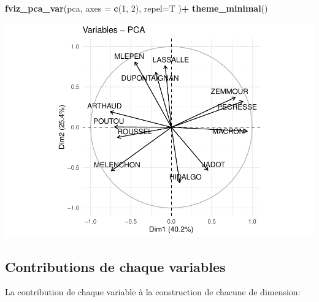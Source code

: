 \documentclass[
]{book}
\newenvironment{Shaded}{\begin{snugshade}}{\end{snugshade}}
\newcommand{\AttributeTok}[1]{\textcolor[rgb]{0.13,0.29,0.53}{#1}}
\newcommand{\DecValTok}[1]{\textcolor[rgb]{0.00,0.00,0.81}{#1}}
\newcommand{\FunctionTok}[1]{\textcolor[rgb]{0.13,0.29,0.53}{\textbf{#1}}}
\newcommand{\NormalTok}[1]{#1}
\newcommand{\SpecialCharTok}[1]{\textcolor[rgb]{0.81,0.36,0.00}{\textbf{#1}}}
\begin{document}
\begin{Shaded}
\begin{Highlighting}[]
\FunctionTok{fviz\_pca\_var}\NormalTok{(pca,  }\AttributeTok{axes =} \FunctionTok{c}\NormalTok{(}\DecValTok{1}\NormalTok{, }\DecValTok{2}\NormalTok{), }\AttributeTok{repel=}\NormalTok{T )}\SpecialCharTok{+}  \FunctionTok{theme\_minimal}\NormalTok{()}
\end{Highlighting}
\end{Shaded}

\includegraphics{manuel_geo_quanti_files/figure-latex/unnamed-chunk-67-1.pdf}

\hypertarget{contributions-de-chaque-variables}{%
\subsection{Contributions de chaque variables}\label{contributions-de-chaque-variables}}

La contribution de chaque variable à la construction de chacune de dimension:

\begin{Shaded}
\end{Shaded}
\end{document}
